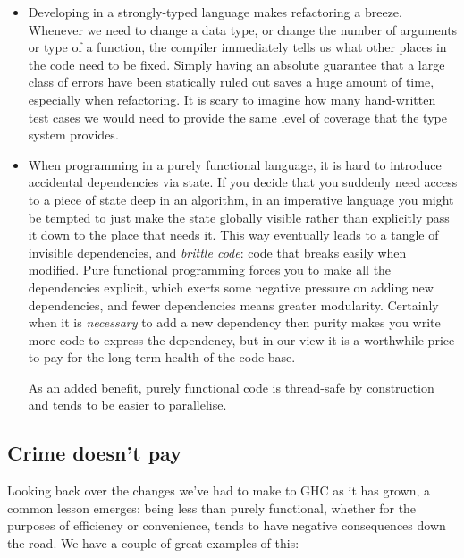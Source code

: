 \documentclass{article}
\begin{document}
{\begin{itemize}
\item Developing in a strongly-typed language makes refactoring a
  breeze.  Whenever we need to change a data type, or change the
  number of arguments or type of a function, the compiler immediately
  tells us what other places in the code need to be fixed.  Simply
  having an absolute guarantee that a large class of errors have been
  statically ruled out saves a huge amount of time, especially when
  refactoring.  It is scary to imagine how many hand-written test
  cases we would need to provide the same level of coverage that the
  type system provides.

\item When programming in a purely functional language, it is
  hard to introduce accidental dependencies via state.  If you decide
  that you suddenly need access to a piece of state deep in an
  algorithm, in an imperative language you might be tempted to just
  make the state globally visible rather than explicitly pass it down
  to the place that needs it.  This way eventually leads to a tangle
  of invisible dependencies, and \emph{brittle code}: code that breaks
  easily when modified.  Pure functional programming forces you to
  make all the dependencies explicit, which exerts some negative
  pressure on adding new dependencies, and fewer dependencies means
  greater modularity.  Certainly when it is \emph{necessary} to add a
  new dependency then purity makes you write more code to express the
  dependency, but in our view it is a worthwhile price to pay for the
  long-term health of the code base.

  As an added benefit, purely functional code is thread-safe by
  construction and tends to be easier to parallelise.
\end{itemize}

%
%

\subsection{Crime doesn't pay}

Looking back over the changes we've had to make to GHC as it has
grown, a common lesson emerges: being less than purely functional,
whether for the purposes of efficiency or convenience, tends to have
negative consequences down the road.  We have a couple of great
examples of this:

}
\end{document}
